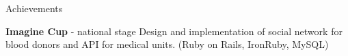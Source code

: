 \begin{rubric}{Achievements}


\entry*[2010]
  \textbf{Imagine Cup}  - national stage
\entry*
  Design and implementation of social network for blood donors and API for medical units.
  (Ruby on Rails, IronRuby, MySQL)

% 

\end{rubric}
